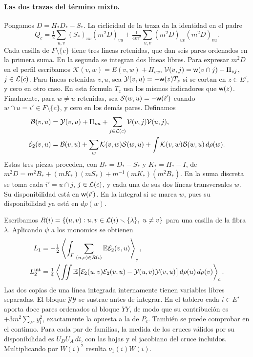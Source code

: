 \paragraph{Las dos trazas del término mixto.}
Pongamos \(D=H_*D_*-S_*\). La ciclicidad de la traza da la identidad en el padre
\[
 Q_c=\tfrac12\sum_{u,v}(S_*)_{uv}(m^2D)_{vu}
       +\tfrac1{4m^2}\sum_{u,v}(m^2D)_{uv}(m^2D)_{vu}.
\]
Cada casilla de \(F\setminus\{c\}\) tiene tres líneas retenidas, que dan seis pares
ordenados en la primera suma. En la segunda se integran dos líneas libres.
Para expresar \(m^2D\) en el perfil escribamos \(\mathcal K(v,w)=E(v,w)+\Pi_{vw}\),
\(\mathcal V(v,j)=\mathsf w(v\cap j)+\Pi_{vj}\), \(j\in \mathcal L(c)\). Para líneas retenidas \(v,u\),
sea \(\mathcal Y(v,u)=-\mathsf w(z)T_z\) si se cortan en \(z\in E'\), y cero en otro caso.
En esta fórmula \(T_z\) usa los mismos indicadores que \(\mathsf w(z)\).
Finalmente, para \(w\ne u\) retenidas, sea \(\mathcal S(w,u)=-\mathsf w(i')\) cuando
\(w\cap u=i'\in F\setminus\{c\}\), y cero en los demás pares. Definamos
\begin{align*}
 \mathcal B(v,u)&=\mathcal Y(v,u)+\Pi_{vu}
                    +\sum_{j\in \mathcal L(c)}\mathcal V(v,j)\mathcal V(u,j),\\
 \mathcal E_2(v,u)&=\mathcal B(v,u)+\sum_w\mathcal K(v,w)\mathcal S(w,u)
                     +\int\mathcal K(v,w)\mathcal B(w,u)\,d\rho(w).
\end{align*}
Estas tres piezas proceden, con \(B_*=D_*-S_*\) y \(K_*=H_*-I\), de
\(m^2D=m^2B_*+(mK_*)(mS_*)+m^{-1}(mK_*)(m^2B_*)\).
En la suma discreta se toma cada \(i'=u\cap j\), \(j\in \mathcal L(c)\), y cada una de
sus dos líneas transversales \(w\). Su disponibilidad está en \(\mathsf w(i')\).
En la integral sí se marca \(w\), pues su disponibilidad ya está en \(d\rho(w)\).

Escribamos \(R(i)=\{(u,v):u,v\in \mathcal L(i)\smallsetminus\{\lambda\},\ u\ne v\}\) para una
casilla de la fibra \(\lambda\). Aplicando \(\psi\) a los monomios se obtienen
\begin{align*}
 L_1&=-\tfrac12\left\langle\int_F
          \sum_{(u,v)\in R(i)}\mathbb E\mathcal E_2(v,u)\right\rangle_c,\\
 L_2^{\rm int}&=\tfrac14\left\langle\iint
 \mathbb E\big[\mathcal E_2(u,v)\mathcal E_2(v,u)-\mathcal Y(u,v)\mathcal Y(v,u)\big]
                 \,d\rho(u)\,d\rho(v)\right\rangle_c .
\end{align*}
Las dos copias de una línea integrada internamente tienen variables libres separadas.
El bloque \(\mathcal Y\mathcal Y\) se sustrae antes de integrar. En el tablero cada
\(i\in E'\) aporta doce pares ordenados al bloque \(YY\), de modo que su contribución
es \(+3m^2\sum_{E'}y_i^2\), exactamente la opuesta a la de \(P_c\).
También se puede comprobar en el continuo. Para cada par de familias, la medida de los
cruces válidos por su disponibilidad es \(U_DU_A\,di\), con las hojas y el jacobiano del
cruce incluidos. Multiplicando por \(W(i)^2\) resulta \(\nu_1(i)W(i)\).

